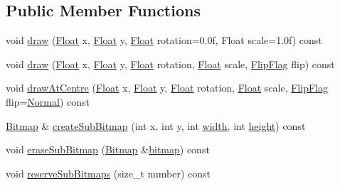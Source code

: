 \subsection*{Public Member Functions}
\begin{DoxyCompactItemize}
\item 
void \hyperlink{classZeta_1_1AllegroBitmap_ab3ddef20d1597683a99dcfdc5cfb3c5f}{draw} (\hyperlink{namespaceZeta_a1e0a1265f9b3bd3075fb0fabd39088ba}{Float} x, \hyperlink{namespaceZeta_a1e0a1265f9b3bd3075fb0fabd39088ba}{Float} y, \hyperlink{namespaceZeta_a1e0a1265f9b3bd3075fb0fabd39088ba}{Float} rotation=0.\+0f, Float scale=1.\+0f) const 
\item 
void \hyperlink{classZeta_1_1AllegroBitmap_a26b3206d585a5f30b990c1279eb92e7a}{draw} (\hyperlink{namespaceZeta_a1e0a1265f9b3bd3075fb0fabd39088ba}{Float} x, \hyperlink{namespaceZeta_a1e0a1265f9b3bd3075fb0fabd39088ba}{Float} y, \hyperlink{namespaceZeta_a1e0a1265f9b3bd3075fb0fabd39088ba}{Float} rotation, \hyperlink{namespaceZeta_a1e0a1265f9b3bd3075fb0fabd39088ba}{Float} scale, \hyperlink{classZeta_1_1Bitmap_a8cb28cf4226b7d6bedf6c9bb2413b3fa}{Flip\+Flag} flip) const 
\item 
void \hyperlink{classZeta_1_1AllegroBitmap_ac914238cb9e48e6f3e4260f7c62b40f8}{draw\+At\+Centre} (\hyperlink{namespaceZeta_a1e0a1265f9b3bd3075fb0fabd39088ba}{Float} x, \hyperlink{namespaceZeta_a1e0a1265f9b3bd3075fb0fabd39088ba}{Float} y, \hyperlink{namespaceZeta_a1e0a1265f9b3bd3075fb0fabd39088ba}{Float} rotation, \hyperlink{namespaceZeta_a1e0a1265f9b3bd3075fb0fabd39088ba}{Float} scale, \hyperlink{classZeta_1_1Bitmap_a8cb28cf4226b7d6bedf6c9bb2413b3fa}{Flip\+Flag} flip=\hyperlink{classZeta_1_1Bitmap_a8cb28cf4226b7d6bedf6c9bb2413b3faad95504740b4fa9384ac72564cd282755}{Normal}) const 
\item 
\hyperlink{classZeta_1_1Bitmap}{Bitmap} \& \hyperlink{classZeta_1_1AllegroBitmap_a92c61e54a550c9756b5567a20625c31d}{create\+Sub\+Bitmap} (int x, int y, int \hyperlink{classZeta_1_1Bitmap_affa526cccd51b4ac5db7aac25ff7f6a9}{width}, int \hyperlink{classZeta_1_1Bitmap_a4d9a82acc6c418dc9b72227b0d63d9aa}{height}) const 
\item 
void \hyperlink{classZeta_1_1AllegroBitmap_a2e7d04979e1c34a3d1c320ba67c429d2}{erase\+Sub\+Bitmap} (\hyperlink{classZeta_1_1Bitmap}{Bitmap} \&\hyperlink{classZeta_1_1AllegroBitmap_aec65e1335da328dd4d7964e97297ea72}{bitmap}) const 
\item 
void \hyperlink{classZeta_1_1AllegroBitmap_ac37c6b783f388afe960479b9addcf0a7}{reserve\+Sub\+Bitmaps} (size\+\_\+t number) const 

\end{DoxyCompactItemize}

